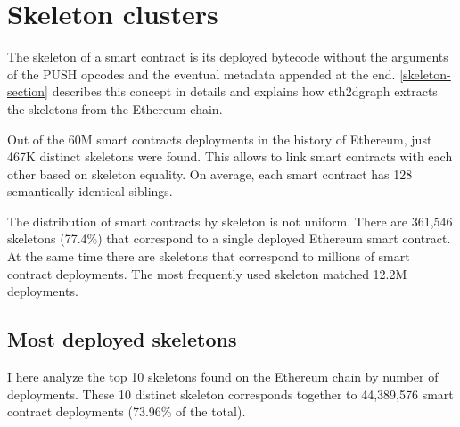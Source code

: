 \section{Skeleton clusters}

The skeleton of a smart contract is its deployed bytecode without the arguments of the PUSH opcodes and the eventual metadata appended at the end. \cref{skeleton-section} describes this concept in details and explains how eth2dgraph extracts the skeletons from the Ethereum chain.

Out of the 60M smart contracts deployments in the history of Ethereum, just 467K distinct skeletons were found. This allows to link smart contracts with each other based on skeleton equality. On average, each smart contract has 128 semantically identical siblings. 

The distribution of smart contracts by skeleton is not uniform. There are 361,546 skeletons (77.4\%) that correspond to a single deployed Ethereum smart contract. At the same time there are skeletons that correspond to millions of smart contract deployments. The most frequently used skeleton matched 12.2M deployments.

\subsection{Most deployed skeletons}

I here analyze the top 10 skeletons found on the Ethereum chain by number of deployments. These 10 distinct skeleton corresponds together to 44,389,576 smart contract deployments (73.96\% of the total).

